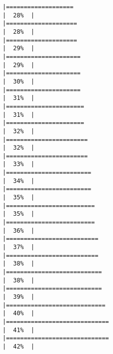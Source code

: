 \documentclass[
]{book}
\begin{document}
\begin{verbatim}
|===================                                                   |  28%  |                                                                              |====================                                                  |  28%  |                                                                              |====================                                                  |  29%  |                                                                              |=====================                                                 |  29%  |                                                                              |=====================                                                 |  30%  |                                                                              |=====================                                                 |  31%  |                                                                              |======================                                                |  31%  |                                                                              |======================                                                |  32%  |                                                                              |=======================                                               |  32%  |                                                                              |=======================                                               |  33%  |                                                                              |========================                                              |  34%  |                                                                              |========================                                              |  35%  |                                                                              |=========================                                             |  35%  |                                                                              |=========================                                             |  36%  |                                                                              |==========================                                            |  37%  |                                                                              |==========================                                            |  38%  |                                                                              |===========================                                           |  38%  |                                                                              |===========================                                           |  39%  |                                                                              |============================                                          |  40%  |                                                                              |=============================                                         |  41%  |                                                                              |=============================                                         |  42%  |                                                                              
\end{verbatim}
\end{document}
